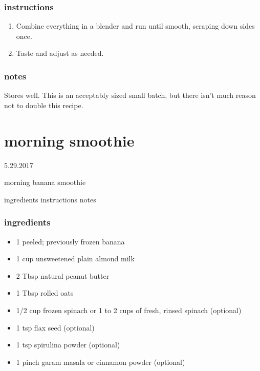 \documentclass[]{book}
\providecommand{\tightlist}{%
  \setlength{\itemsep}{0pt}\setlength{\parskip}{0pt}}
\begin{document}
\hypertarget{instructions-6}{%
\subsection{instructions}\label{instructions-6}}

\begin{enumerate}
\def\labelenumi{\arabic{enumi}.}
\tightlist
\item
  Combine everything in a blender and run until smooth, scraping down sides once.
\item
  Taste and adjust as needed.
\end{enumerate}

\hypertarget{notes-6}{%
\subsection{notes}\label{notes-6}}

Stores well. This is an acceptably sized small batch, but there isn't much reason not to double this recipe.

\hypertarget{morning-smoothie}{%
\chapter{morning smoothie}\label{morning-smoothie}}

5.29.2017

morning banana smoothie

ingredients \textbar{}
instructions \textbar{}
notes

\hypertarget{ingredients-7}{%
\subsection{ingredients}\label{ingredients-7}}

\begin{itemize}
\tightlist
\item
  1 peeled; previously frozen banana
\item
  1 cup unsweetened plain almond milk
\item
  2 Tbsp natural peanut butter
\item
  1 Tbsp rolled oats
\item
  1/2 cup frozen spinach or 1 to 2 cups of fresh, rinsed spinach (optional)
\item
  1 tsp flax seed (optional)
\item
  1 tsp spirulina powder (optional)
\item
  1 pinch garam masala or cinnamon powder (optional)
\end{itemize}
\end{document}
